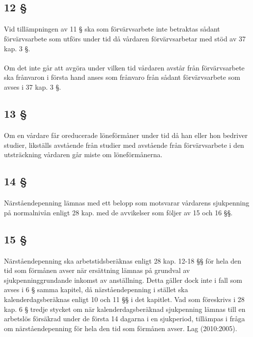 \documentclass[a4paper,notitlepage,openany,10pt]{book}
\begin{document}
\subsection*{12 §}
\paragraph*{}
Vid tillämpningen av 11 § ska som förvärvsarbete inte betraktas sådant förvärvsarbete som utförs under tid då vårdaren förvärvsarbetar med stöd av 37 kap. 3 §.
\paragraph*{}
Om det inte går att avgöra under vilken tid vårdaren avstår från förvärvsarbete ska frånvaron i första hand anses som frånvaro från sådant förvärvsarbete som avses i 37 kap. 3 §.
\subsection*{13 §}
\paragraph*{}
Om en vårdare får oreducerade löneförmåner under tid då han eller hon bedriver studier, likställs avstående från studier med avstående från förvärvsarbete i den utsträckning vårdaren går miste om löneförmånerna.
\subsection*{14 §}
\paragraph*{}
Närståendepenning lämnas med ett belopp som motsvarar vårdarens sjukpenning på normalnivån enligt 28 kap. med de avvikelser som följer av 15 och 16 §§.
\subsection*{15 §}
\paragraph*{}
Närståendepenning ska arbetstidsberäknas enligt 28 kap. 12-18 §§ för hela den tid som förmånen avser när ersättning lämnas på grundval av sjukpenninggrundande inkomst av anställning. Detta gäller dock inte i fall som avses i 6 § samma kapitel, då närståendepenning i stället ska kalenderdagsberäknas enligt 10 och 11 §§ i det kapitlet. Vad som föreskrivs i 28 kap. 6 § tredje stycket om när kalenderdagsberäknad sjukpenning lämnas till en arbetslös försäkrad under de första 14 dagarna i en sjukperiod, tillämpas i fråga om närståendepenning för hela den tid som förmånen avser.
Lag (2010:2005).
\end{document}
